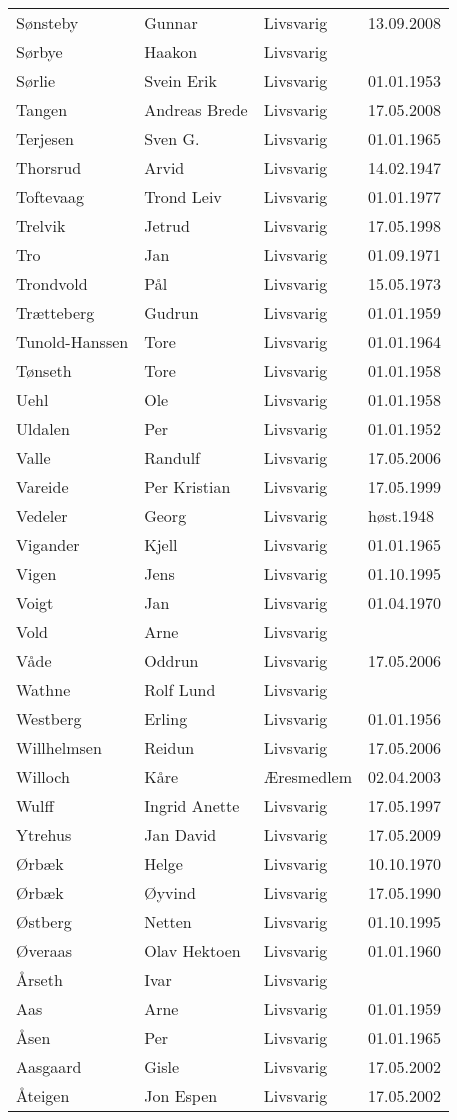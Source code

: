 \documentclass[fsbok.tex]{subfiles}
\begin{document}
\begin{longtable}{llll}
Sønsteby	&	Gunnar	&	Livsvarig	&	13.09.2008	\\
Sørbye	&	Haakon	&	Livsvarig 	&		\\
Sørlie	&	Svein Erik	&	Livsvarig 	&	01.01.1953	\\
Tangen	&	Andreas Brede	&	Livsvarig	&	17.05.2008	\\
Terjesen	&	Sven G.	&	Livsvarig 	&	01.01.1965	\\
Thorsrud	&	Arvid	&	Livsvarig 	&	14.02.1947	\\
Toftevaag	&	Trond Leiv	&	Livsvarig 	&	01.01.1977	\\
Trelvik 	&	Jetrud	&	Livsvarig	&	17.05.1998	\\
Tro	&	Jan	&	Livsvarig 	&	01.09.1971	\\
Trondvold	&	Pål	&	Livsvarig 	&	15.05.1973	\\
Trætteberg	&	Gudrun	&	Livsvarig 	&	01.01.1959	\\
Tunold-Hanssen	&	Tore	&	Livsvarig 	&	01.01.1964	\\
Tønseth	&	Tore	&	Livsvarig 	&	01.01.1958	\\
Uehl	&	Ole	&	Livsvarig 	&	01.01.1958	\\
Uldalen	&	Per	&	Livsvarig 	&	01.01.1952	\\
Valle	&	Randulf	&	Livsvarig	&	17.05.2006	\\
Vareide 	&	Per Kristian	&	Livsvarig	&	17.05.1999	\\
Vedeler	&	Georg	&	Livsvarig	&	høst.1948	\\
Vigander	&	Kjell	&	Livsvarig 	&	01.01.1965	\\
Vigen 	&	Jens	&	Livsvarig	&	01.10.1995	\\
Voigt	&	Jan	&	Livsvarig 	&	01.04.1970	\\
Vold	&	Arne	&	Livsvarig 	&		\\
Våde	&	Oddrun	&	Livsvarig	&	17.05.2006	\\
Wathne	&	Rolf Lund	&	Livsvarig 	&		\\
Westberg	&	Erling	&	Livsvarig 	&	01.01.1956	\\
Willhelmsen	&	Reidun	&	Livsvarig	&	17.05.2006	\\
Willoch	&	Kåre	&	Æresmedlem	&	02.04.2003	\\
Wulff 	&	Ingrid Anette	&	Livsvarig	&	17.05.1997	\\
Ytrehus	&	Jan David	&	Livsvarig	&	17.05.2009	\\
Ørbæk	&	Helge	&	Livsvarig 	&	10.10.1970	\\
Ørbæk	&	Øyvind	&	Livsvarig 	&	17.05.1990	\\
Østberg 	&	Netten	&	Livsvarig	&	01.10.1995	\\
Øveraas	&	Olav Hektoen	&	Livsvarig 	&	01.01.1960	\\
Årseth	&	Ivar	&	Livsvarig 	&		\\
Aas	&	Arne	&	Livsvarig 	&	01.01.1959	\\
Åsen	&	Per	&	Livsvarig 	&	01.01.1965	\\
Aasgaard 	&	Gisle	&	Livsvarig	&	17.05.2002	\\
Åteigen 	&	Jon Espen	&	Livsvarig	&	17.05.2002	\\
    \end{longtable}
\end{document}
